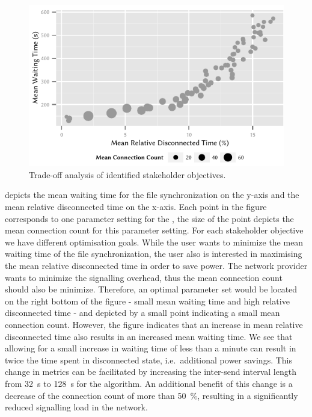 \begin{figure}
  \centering
  \includegraphics{application/cloud_file_synchronization/numerical_evaluation/figures/summary}
  \caption{Trade-off analysis of identified stakeholder objectives.}
  \label{fig:application:cloud_file_synchronisation:numerical_evaluation:trade_off_analysis:summary}
\end{figure}

 depicts the mean waiting time for the file synchronization on the y-axis and the mean relative disconnected time on the x-axis.
Each point in the figure corresponds to one parameter setting for the \algointerval, the size of the point depicts the mean connection count for this parameter setting.
For each stakeholder objective we have different optimisation goals.
While the user wants to minimize the mean waiting time of the file synchronization, the user also is interested in maximising the mean relative disconnected time in order to save power.
The network provider wants to minimize the signalling overhead, thus the mean connection count should also be minimize.
Therefore, an optimal parameter set would be located on the right bottom of the figure - small mean waiting time and high relative disconnected time - and depicted by a small point indicating a small mean connection count.
However, the figure indicates that an increase in mean relative disconnected time also results in an increased mean waiting time.
We see that allowing for a small increase in waiting time of less than a minute can result in twice the time spent in disconnected state, i.e.\ additional power savings.
This change in metrics can be facilitated by increasing the inter-send interval length from \SI{32}{\second} to \SI{128}{\second} for the \algointerval algorithm.
An additional benefit of this change is a decrease of the connection count of more than \SI{50}{\percent}, resulting in a significantly reduced signalling load in the network.
